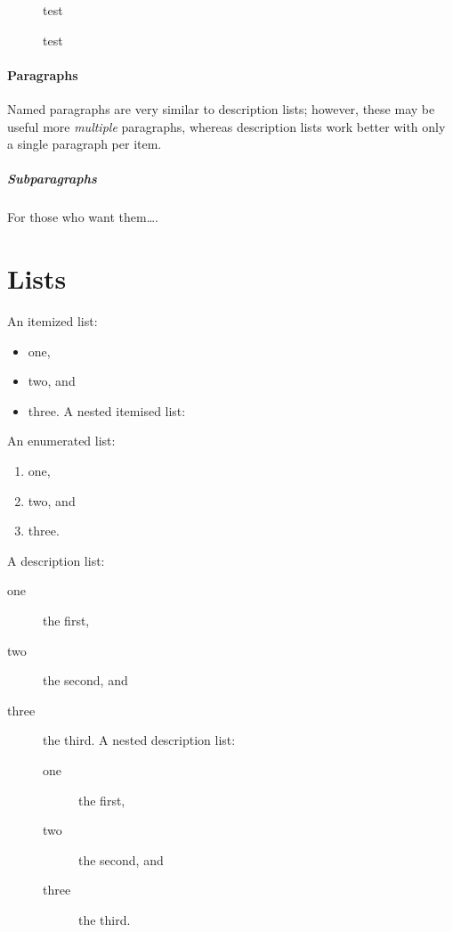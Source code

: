 
\begin{figure}[!ht]
	\centering test
	\caption{test}
\end{figure}

\paragraph{Paragraphs} Named paragraphs are very similar to description lists; however, these may be useful more \emph{multiple} paragraphs, whereas description lists work better with only a single paragraph per item.

\subparagraph{Subparagraphs} For those who want them\dots.

\section{Lists}
An itemized list:
\begin{itemize}
	\item one,
	\item two, and
	\item three.
	      A nested itemised list:
\end{itemize}
An enumerated list:
\begin{enumerate}
	\item one,
	\item two, and
	\item three.
\end{enumerate}
A description list:
\begin{description}
	\item [one] the first,
	\item [two] the second, and
	\item [three] the third. A nested description list:
	      \begin{description}
		      \item [one] the first,
		      \item [two] the second, and
		      \item [three] the third.
	      \end{description}
\end{description}
